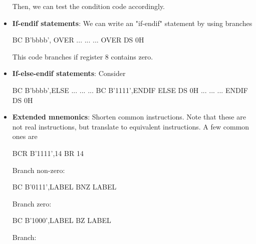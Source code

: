 \documentclass{report}
\begin{document}
\begin{itemize}
                \bigbreak \noindent 
                Then, we can test the condition code accordingly.
            \item \textbf{If-endif statements}: We can write an "if-endif" statement by using branches
                \bigbreak \noindent 
                \begin{cppcode}
                        BC      B'bbbb', OVER
                                ...
                                ...
                                ...
                OVER    DS      0H
                \end{cppcode}
                \bigbreak \noindent 
                This code branches if register 8 contains zero.
            \item \textbf{If-else-endif statements}: Consider
                \bigbreak \noindent 
                \begin{cppcode}
                        BC      B'bbbb',ELSE
                                ...
                                ...
                                ...
                        BC      B'1111',ENDIF
                ELSE    DS      0H
                                ...
                                ...
                                ...
                ENDIF   DS      0H
                \end{cppcode}
            \item \textbf{Extended mnemonics}: Shorten common instructions. Note that these are not real instructions, but translate to equivalent instructions. A few common ones are
                \bigbreak \noindent 
                \begin{cppcode}
                BCR     B'1111',14
                BR      14
                \end{cppcode}
                \bigbreak \noindent 
                Branch non-zero:
                \bigbreak \noindent 
                \begin{cppcode}
                BC    B'0111',LABEL
                BNZ   LABEL
                \end{cppcode}
                \bigbreak \noindent 
                Branch zero:
                \bigbreak \noindent 
                \begin{cppcode}
                BC    B'1000',LABEL
                BZ    LABEL
                \end{cppcode}
                \bigbreak \noindent 
                Branch:
                \bigbreak \noindent 
                \begin{cppcode}

\end{cppcode}
\end{itemize}
\end{document}
